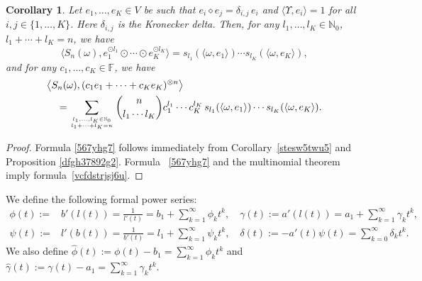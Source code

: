 \documentclass[12pt]{article}
\newtheorem{corollary}[theorem]{Corollary}
\theoremstyle{remark}
\theoremstyle{remark}
\theoremstyle{remark}
\begin{document}
\begin{corollary} \label{783eyeh32} Let $e_1,\dots,e_K\in V$ be such that $e_i\diamond e_j=\delta_{i,j}\,e_i$ and $\langle\Upsilon,e_i\rangle=1$ for all $i,j\in\{1,\dots,K\}$. Here $\delta_{i,j}$ is the Kronecker delta.  Then, for any $l_1,\dots,l_K\in \mathbb N_0$, $l_1+\cdots+l_K=n$, we have
\begin{equation}\label{567yhg7}\langle S_n(\omega),e_1^{\odot l_1}\odot\cdots\odot e_K^{\odot l_K}\rangle=s_{l_1}(\langle\omega,e_1\rangle)\cdots s_{l_K}(\langle\omega,e_K\rangle),\end{equation}
and for any $c_1,\dots, c_K\in \mathbb F$, we have
\begin{align}
&\big\langle S_n(\omega),(c_1e_1+\cdots+c_Ke_K)^{\otimes n}\big\rangle\notag\\
&\quad=\sum_{{l_1,\dots,l_K\in \mathbb N_0}\atop{l_1+\cdots+l_K=n}}{n\choose{ l_1\cdots l_K}}c_1^{l_1}\cdots c_K^{l_K}\, s_{l_1}(\langle\omega,e_1\rangle)\cdots s_{l_K}(\langle\omega,e_K\rangle).\label{vcfdstrjsj6u}\end{align}
\end{corollary}

\begin{proof} Formula \eqref{567yhg7} follows immediately  from Corollary~\ref{stesw5twu5} and Proposition \ref{dfgh37892g2}. Formula~ \eqref{567yhg7}  and the multinomial theorem imply formula~\eqref{vcfdstrjsj6u}. 
\end{proof}

We define the following formal power series:
\begin{align*}
\phi(t):=&b'(l(t))=\frac{1}{l'(t)}=b_1+\sum_{k=1}^\infty \phi_kt^k,\quad
\gamma(t):=a'(l(t))=a_1+\sum_{k=1}^\infty \gamma_kt^k,\\
\psi(t):=&l'(b(t))=\frac1{b'(t)}=l_1+\sum_{k=1}^\infty \psi_kt^k,\quad \delta(t):=-a'(t)\psi(t)=\sum_{k=0}^\infty\delta_kt^k.
\end{align*} 
We also define $\widehat\phi(t):=\phi(t)-b_1=\sum_{k=1}^\infty \phi_kt^k$ and $\widehat\gamma(t):=\gamma(t)-a_1=\sum_{k=1}^\infty \gamma_kt^k$.
\end{document}
